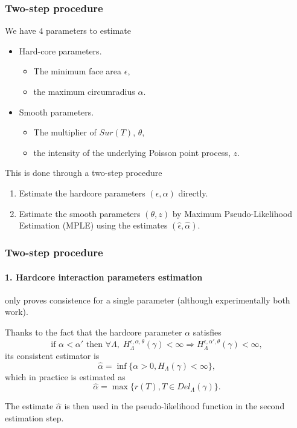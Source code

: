 \documentclass[c, 10pt]{beamer}
\begin{document}
\begin{frame}\frametitle{Two-step procedure}
\begin{small}
We have $4$ parameters to estimate
\begin{itemize}
\item Hard-core parameters.
    \begin{itemize}
    \item The minimum face area $\epsilon$,
    \item the maximum circumradius $\alpha$.
    \end{itemize}
\item Smooth parameters.
    \begin{itemize}
    \item The multiplier of $Sur(T)$, $\theta$,
    \item the intensity of the underlying Poisson point process, $z$.
    \end{itemize}
\end{itemize}
\vspace{5mm}
This is done through a \alert{two-step procedure}
\begin{enumerate}
    \item Estimate the hardcore parameters $(\epsilon, \alpha)$ directly.
    \item Estimate the smooth parameters $(\theta,z)$ by \alert{Maximum Pseudo-Likelihood Estimation} (MPLE) using the estimates $(\hat\epsilon,\hat\alpha)$.
\end{enumerate}
\end{small}


\end{frame}

\begin{frame}\frametitle{Two-step procedure}\framesubtitle{1. Hardcore interaction parameters estimation}
\begin{small}
 only proves consistence for a single parameter (although experimentally both work).\newline

Thanks to the fact that the hardcore parameter $\alpha$ satisfies
$$ \text{if } \alpha < \alpha' \text{ then  } \forall \Lambda, \; H^{\epsilon,\alpha,\theta}_\Lambda(\gamma) < \infty \Rightarrow  H^{\epsilon,\alpha',\theta}_\Lambda(\gamma)<\infty,$$ 
its consistent estimator is
$$\hat\alpha = \inf\{\alpha > 0, H_\Lambda(\gamma) < \infty \},$$
which in practice is estimated as
$$\hat\alpha = \max\{r(T), T\in Del_\Lambda(\gamma)\}.$$

The estimate $\hat\alpha$ is then used in the pseudo-likelihood function in the second estimation step.

\end{small}
\end{frame}
\end{document}
